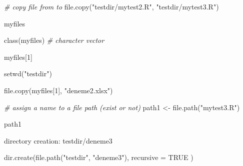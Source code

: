 \documentclass[
]{book}
\newenvironment{Shaded}{\begin{snugshade}}{\end{snugshade}}
\newcommand{\AttributeTok}[1]{\textcolor[rgb]{0.77,0.63,0.00}{#1}}
\newcommand{\CommentTok}[1]{\textcolor[rgb]{0.56,0.35,0.01}{\textit{#1}}}
\newcommand{\ConstantTok}[1]{\textcolor[rgb]{0.00,0.00,0.00}{#1}}
\newcommand{\DecValTok}[1]{\textcolor[rgb]{0.00,0.00,0.81}{#1}}
\newcommand{\FunctionTok}[1]{\textcolor[rgb]{0.00,0.00,0.00}{#1}}
\newcommand{\NormalTok}[1]{#1}
\newcommand{\OtherTok}[1]{\textcolor[rgb]{0.56,0.35,0.01}{#1}}
\newcommand{\StringTok}[1]{\textcolor[rgb]{0.31,0.60,0.02}{#1}}
\begin{document}
\begin{Shaded}
\begin{Highlighting}[]
\CommentTok{\# copy file from to}
\FunctionTok{file.copy}\NormalTok{(}\StringTok{"testdir/mytest2.R"}\NormalTok{, }\StringTok{"testdir/mytest3.R"}\NormalTok{)}
\end{Highlighting}
\end{Shaded}

\begin{Shaded}
\begin{Highlighting}[]
\NormalTok{myfiles}
\end{Highlighting}
\end{Shaded}

\begin{Shaded}
\begin{Highlighting}[]
\FunctionTok{class}\NormalTok{(myfiles)   }\CommentTok{\# character vector}
\end{Highlighting}
\end{Shaded}

\begin{Shaded}
\begin{Highlighting}[]
\NormalTok{myfiles[}\DecValTok{1}\NormalTok{]}
\end{Highlighting}
\end{Shaded}

\begin{Shaded}
\begin{Highlighting}[]
\FunctionTok{setwd}\NormalTok{(}\StringTok{"testdir"}\NormalTok{)}

\FunctionTok{file.copy}\NormalTok{(myfiles[}\DecValTok{1}\NormalTok{], }\StringTok{"deneme2.xlsx"}\NormalTok{)}
\end{Highlighting}
\end{Shaded}

\begin{Shaded}
\begin{Highlighting}[]
\CommentTok{\# assign a name to a file path (exist or not)}
\NormalTok{path1 }\OtherTok{\textless{}{-}} \FunctionTok{file.path}\NormalTok{(}\StringTok{"mytest3.R"}\NormalTok{)}

\NormalTok{path1}
\end{Highlighting}
\end{Shaded}

directory creation: testdir/deneme3

\begin{Shaded}
\begin{Highlighting}[]
\FunctionTok{dir.create}\NormalTok{(}\FunctionTok{file.path}\NormalTok{(}\StringTok{"testdir"}\NormalTok{, }\StringTok{"deneme3"}\NormalTok{), }\AttributeTok{recursive =} \ConstantTok{TRUE}\NormalTok{ )}
\end{Highlighting}
\end{Shaded}
\end{document}
